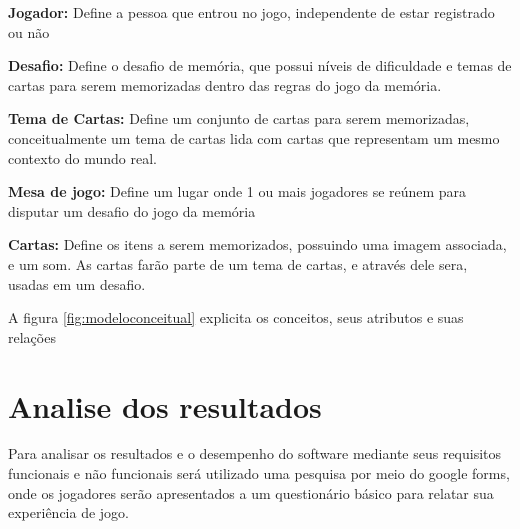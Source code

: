 \begin{alineascomponto}
  \item \textbf{Jogador:} Define a pessoa que entrou no jogo, independente de estar registrado ou não
  \item \textbf{Desafio:} Define o desafio de memória, que possui níveis de dificuldade e temas de cartas para serem memorizadas dentro das regras do jogo da memória.  
  \item \textbf{Tema de Cartas:} Define um conjunto de cartas para serem memorizadas, conceitualmente um tema de cartas lida com cartas que representam um mesmo contexto do mundo real.
  \item \textbf{Mesa de jogo:} Define um lugar onde 1 ou mais jogadores se reúnem para disputar um desafio do jogo da memória 
  \item \textbf{Cartas:}  Define os itens a serem memorizados, possuindo uma imagem associada, e um som. As cartas farão parte de um tema de cartas, e através dele sera, usadas em um desafio. 
\end{alineascomponto}


A figura \ref{fig:modeloconceitual} explicita os conceitos, seus atributos e suas relações

\begin{figure}[h!]
  \centering
\end{figure}

\section{Analise dos resultados}

Para analisar os resultados e o desempenho do software mediante seus requisitos funcionais e não funcionais será utilizado uma pesquisa por meio do google forms, onde os jogadores serão apresentados a um questionário básico para relatar sua experiência de jogo.

